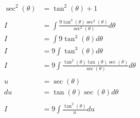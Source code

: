\documentclass[12pt]{article}
\begin{document}
\begin{align}
    \sec^2(\theta)                                   & = \tan^2(\theta) + 1                                                                                                                                 \\
    \nonumber                                                                                                                                                                                               \\
    I                                                & = \int \frac{9\tan^3(\theta)\sec^2(\theta)}{\sec^2(\theta)} d\theta                                                                                  \\
    I                                                & = \int 9\tan^3(\theta) d\theta                                                                                                                       \\
    I                                                & = 9\int \tan^3(\theta) d\theta                                                                                                                       \\
    I                                                & = 9\int \frac{\tan^2(\theta)\tan(\theta)\sec(\theta)}{\sec(\theta)} d\theta                                                                          \\
    \nonumber                                                                                                                                                                                               \\
    u                                                & = \sec(\theta)                                                                                                                                       \\
    du                                               & = \tan(\theta)\sec(\theta) d\theta                                                                                                                   \\
    \nonumber                                                                                                                                                                                               \\
    I                                                & = 9\int \frac{\tan^2(\theta)}{u} du                                                                                                                  \\

\end{align}
\end{document}
